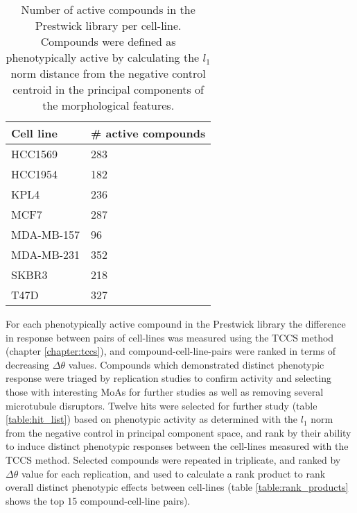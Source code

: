 \documentclass[a4paper,11pt,twoside,openright]{scrbook}
\begin{document}
\begin{table}
    \captionsetup{width=0.8\textwidth}
    \caption[Number of active compounds in the Prestwick library per cell-line]{
    Number of active compounds in the Prestwick library per cell-line.
    Compounds were defined as phenotypically active by calculating the $l_1$ norm distance from the negative control 
centroid in the principal components of the morphological features.
    }
    \begin{footnotesize}
\begin{tabular}{@{}ll@{}}
\toprule
Cell line  & \# active compounds \\ \midrule
HCC1569    & 283                 \\
HCC1954    & 182                 \\
KPL4       & 236                 \\
MCF7       & 287                 \\
MDA-MB-157 & 96                  \\
MDA-MB-231 & 352                 \\
SKBR3      & 218                 \\
T47D       & 327                 \\ \bottomrule
\end{tabular}
\end{footnotesize}
\label{table:active_per_cell_line}
\end{table}


For each phenotypically active compound in the Prestwick library the difference in response between pairs of cell-lines 
was measured using the TCCS method (chapter \ref{chapter:tccs}), and compound-cell-line-pairs were ranked in terms of 
decreasing $\Delta\theta$ values.
Compounds which demonstrated distinct phenotypic response were triaged by replication studies to confirm activity and 
selecting those with interesting MoAs for further studies as well as removing several microtubule disruptors.
Twelve hits were selected for further study (table \ref{table:hit_list}) based on phenotypic activity as determined 
with the $l_1$ norm from the negative control in principal component space, and rank by their ability to induce 
distinct phenotypic responses between the cell-lines measured with the TCCS method.
Selected compounds were repeated in triplicate, and ranked by $\Delta\theta$ value for each replication, and used to 
calculate a rank product to rank overall distinct phenotypic effects between cell-lines (table 
\ref{table:rank_products} shows the top 15 compound-cell-line pairs).
\end{document}
